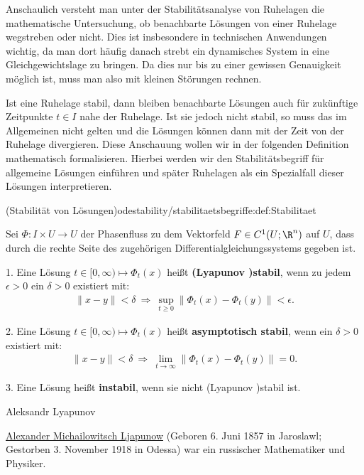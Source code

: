 \documentclass[letterpaper,10pt,german]{jupyterBook}
\begin{document}
\par
Anschaulich versteht man unter der Stabilitätsanalyse von Ruhelagen die mathematische Untersuchung, ob benachbarte Lösungen von einer Ruhelage wegstreben oder nicht.
Dies ist insbesondere in technischen Anwendungen wichtig, da man dort häufig danach strebt ein dynamisches System in eine Gleichgewichtslage zu bringen.
Da dies nur bis zu einer gewissen Genauigkeit möglich ist, muss man also mit kleinen Störungen rechnen.

\par
Ist eine Ruhelage stabil, dann bleiben benachbarte Lösungen auch für zukünftige Zeitpunkte \(t \in I\) nahe der Ruhelage.
Ist sie jedoch nicht stabil, so muss das im Allgemeinen nicht gelten und die Lösungen können dann mit der Zeit von der Ruhelage divergieren.
Diese Anschauung wollen wir in der folgenden Definition mathematisch formalisieren.
Hierbei werden wir den Stabilitätsbegriff für allgemeine Lösungen einführen und später Ruhelagen als ein Spezialfall dieser Lösungen interpretieren.
\begin{definition}{(Stabilität von Lösungen)}{odestability/stabilitaetsbegriffe:def:Stabilitaet}



\par
Sei \(\Phi \colon I \times U \rightarrow U\) der Phasenfluss zu dem Vektorfeld \(F\in C^1(U;\R^n)\) auf \(U\), dass durch die rechte Seite des zugehörigen Differentialgleichungssystems gegeben ist.

\par
1. Eine Lösung \(t \in [0,\infty) \mapsto \Phi_t(x)\) heißt \textbf{(Lyapunov )stabil}, wenn zu jedem \(\epsilon > 0\) ein \(\delta>0\) existiert mit:
\begin{align*}
\|x-y\|<\delta \ \Rightarrow \ \sup_{t\geq0}\|\Phi_t(x)-\Phi_t(y)\|<\epsilon.
\end{align*}
\par
2. Eine Lösung \( t \in [0,\infty) \mapsto \Phi_t(x)\) heißt \textbf{asymptotisch stabil}, wenn ein \(\delta > 0\) existiert mit:
\begin{align*}
\|x-y\|<\delta \ \Rightarrow \ \lim_{t\to\infty}\|\Phi_t(x)-\Phi_t(y)\|=0.
\end{align*}
\par
3. Eine Lösung heißt \textbf{instabil}, wenn sie nicht (Lyapunov )stabil ist.
\end{definition}

\begin{emphBox}{Aleksandr Lyapunov}{}

\par
\href{https://de.wikipedia.org/wiki/Alexander\_Michailowitsch\_Ljapunow}{Alexander Michailowitsch Ljapunow} (Geboren 6. Juni 1857 in Jaroslawl; Gestorben 3. November 1918 in Odessa) war ein russischer Mathematiker und Physiker.
\end{emphBox}
\end{document}

